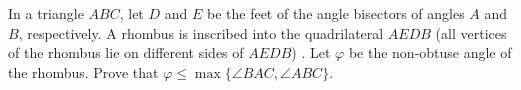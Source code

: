In a triangle 
$ABC$, 
 let 
$D$
 and 
$E$
 be the feet of the angle bisectors of angles 
$A$
 and 
$B$, 
 respectively. A rhombus is inscribed into the quadrilateral 
$AEDB$
 (all vertices of the rhombus lie on different sides of 
$AEDB$)
. Let 
$\varphi$
 be the non-obtuse angle of the rhombus. Prove that 
$\varphi \le \max \{  \angle BAC, \angle ABC  \}$.

